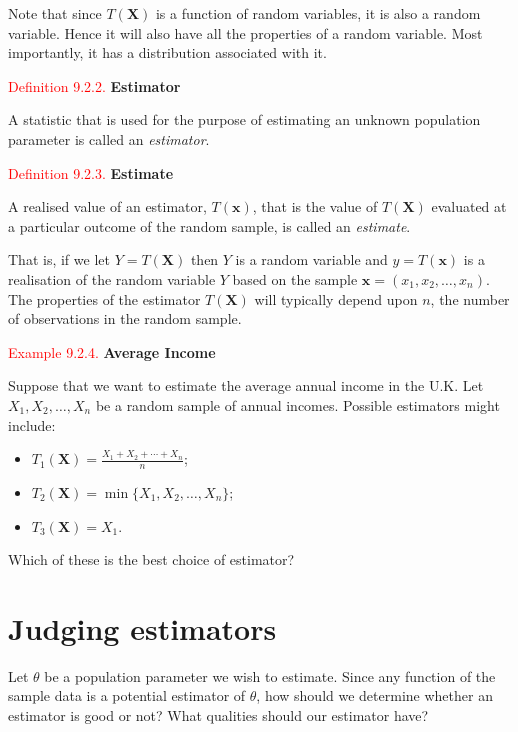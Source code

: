\documentclass[
]{book}
\providecommand{\tightlist}{%
  \setlength{\itemsep}{0pt}\setlength{\parskip}{0pt}}
\begin{document}
Note that since \(T(\mathbf{X})\) is a function of random variables, it is also a random variable. Hence it will also have all the properties of a random variable. Most importantly, it has a distribution associated with it.

\leavevmode{}%
\textcolor{red}{Definition 9.2.2.}
{\textbf{Estimator}}

A statistic that is used for the purpose of estimating an unknown population parameter is called an \emph{estimator}.

\leavevmode{}%
\textcolor{red}{Definition 9.2.3.}
{\textbf{Estimate}}

A realised value of an estimator, \(T(\mathbf{x})\), that is the value of \(T(\mathbf{X})\) evaluated at a particular outcome of the random sample, is called an \emph{estimate}.

That is, if we let \(Y = T (\mathbf{X})\) then \(Y\) is a random variable and \(y= T (\mathbf{x})\) is a realisation of the random variable \(Y\) based on the sample \(\mathbf{x} = (x_1, x_2, \ldots, x_n)\). The properties of the estimator \(T (\mathbf{X})\) will typically depend upon \(n\), the number of observations in the random sample.

\leavevmode{}%
\textcolor{red}{Example 9.2.4.}
{\textbf{Average Income}}

Suppose that we want to estimate the average annual income in the U.K. Let \(X_1,X_2,\dots,X_n\) be a random sample of annual incomes. Possible estimators might include:

\begin{itemize}
\tightlist
\item
  \(T_1(\mathbf{X}) = \frac{X_1 + X_2 + \cdots + X_n}{n}\);
\item
  \(T_2(\mathbf{X}) = \min \{X_1,X_2,\dots,X_n\}\);
\item
  \(T_3(\mathbf{X}) = X_1\).
\end{itemize}

Which of these is the best choice of estimator?

\hypertarget{paraestimate:judge}{%
\section{Judging estimators}\label{paraestimate:judge}}

Let \(\theta\) be a population parameter we wish to estimate. Since any function of the sample data is a potential estimator of \(\theta\), how should we determine whether an estimator is good or not? What qualities should our estimator have?
\end{document}
